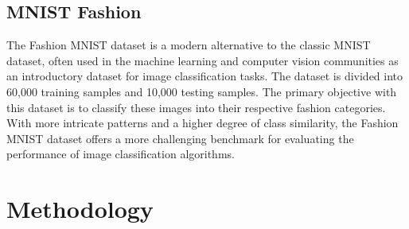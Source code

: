 \documentclass[journal]{IEEEtran}
\begin{document}
	\subsection{MNIST Fashion}
	The Fashion MNIST dataset \cite{Fashion_MNIST} is a modern alternative to the classic MNIST dataset, 
	often used in the machine learning and computer vision communities as an introductory dataset for image classification tasks. 
	The dataset is divided into 60,000 training samples and 10,000 testing samples. 
	The primary objective with this dataset is to classify these images into their respective fashion categories. 
	With more intricate patterns and a higher degree of class similarity, the Fashion MNIST dataset offers a more challenging benchmark 
	for evaluating the performance of image classification algorithms.

	
	\section{Methodology}
	\label{sec:methodology}
	
	\begin{comment}

	\subsection{Data Exploration}
	
	In the final pre-processing phase of the diabetes dataset, we undertook further exploration of the remaining features to refine our selection.
	
	We initially eliminated features that exhibited extremely low variance. In this context, features related to heavy alcohol consumption and stroke were dropped due to their negligible number of positive cases, especially in scenarios with high $\rho$.
	
	Subsequently, we identified features such as `Sex', `Smoker', `Fruits', and `Veggies' that demonstrated a very low correlation with the response variable. After their removal, we were left with a reduced feature set comprising six elements.
	
	In the final step, we examined the distribution of the remaining features using a kernel density plot method.
	The results of this can be seen in Figure \ref{fig:kdedistro}
	Additionally, to mitigate the impact of skewness in each feature, 'BMI' and 'Physical Health' were further subjected to quantile normalization.
	All of the features were then min-max normalized to a 0 to 1 domain.. 

	\begin{figure*}
		\centering
		\texttt{[image: Images/kde\_distro]}
		\caption{Kernel Densities of Features.}
		\label{fig:kdedistro}
	\end{figure*}
	\end{comment}
	
\end{document}
